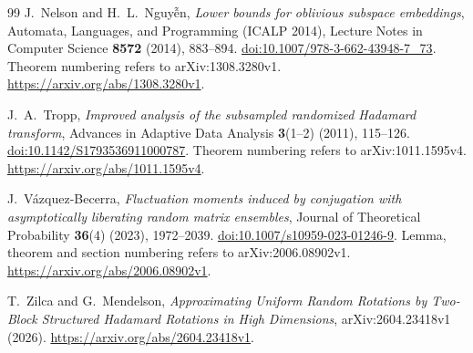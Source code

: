 \documentclass[11pt]{article}
\theoremstyle{definition}
\theoremstyle{remark}
\theoremstyle{plain}
\begin{document}
\begin{thebibliography}{99}
J.~Nelson and H.~L.~Nguy\~{\^e}n,
\emph{Lower bounds for oblivious subspace embeddings},
Automata, Languages, and Programming (ICALP 2014),
Lecture Notes in Computer Science \textbf{8572} (2014), 883--894.
\href{https://doi.org/10.1007/978-3-662-43948-7_73}{doi:10.1007/978-3-662-43948-7\_73}.
Theorem numbering refers to arXiv:1308.3280v1.
\url{https://arxiv.org/abs/1308.3280v1}.

J.~A.~Tropp,
\emph{Improved analysis of the subsampled randomized Hadamard
transform}, Advances in Adaptive Data Analysis \textbf{3}(1--2)
(2011), 115--126.
\href{https://doi.org/10.1142/S1793536911000787}{doi:10.1142/S1793536911000787}.
Theorem numbering refers to arXiv:1011.1595v4.
\url{https://arxiv.org/abs/1011.1595v4}.

J.~V\'azquez-Becerra,
\emph{Fluctuation moments induced by conjugation with asymptotically
liberating random matrix ensembles},
Journal of Theoretical Probability \textbf{36}(4) (2023), 1972--2039.
\href{https://doi.org/10.1007/s10959-023-01246-9}{doi:10.1007/s10959-023-01246-9}.
Lemma, theorem and section numbering refers to arXiv:2006.08902v1.
\url{https://arxiv.org/abs/2006.08902v1}.

T.~Zilca and G.~Mendelson,
\emph{Approximating Uniform Random Rotations by Two-Block
Structured Hadamard Rotations in High Dimensions},
arXiv:2604.23418v1 (2026).
\url{https://arxiv.org/abs/2604.23418v1}.

\end{thebibliography}
\end{document}
